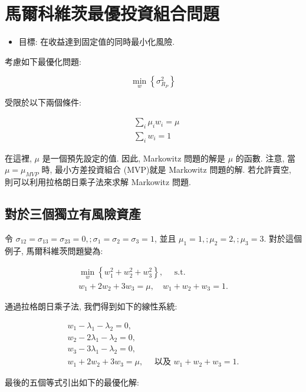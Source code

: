\documentclass[letterpaper]{article}
\begin{document}
		\section{馬爾科維茨最優投資組合問題}
		\begin{itemize}
			\item 目標: 在收益達到固定值的同時最小化風險. 
		\end{itemize}
		
		考慮如下最優化問題: 
		
		$$
		\min _{w}\left\{\sigma_{R_{P}}^{2}\right\}
		$$
		
		受限於以下兩個條件: 
		
		$$
		\begin{aligned}
			& \sum_{i} \mu_{i} w_{i}=\mu \\
			& \sum_{i} w_{i}=1
		\end{aligned}
		$$
		
		在這裡, $\mu$ 是一個預先設定的值. 因此, Markowitz 問題的解是 $\mu$ 的函數. 注意, 當 $\mu = \mu_{MVP}$ 時, 最小方差投資組合 (MVP)就是 Markowitz 問題的解. 若允許賣空, 則可以利用拉格朗日乘子法來求解 Markowitz 問題. 
		
		
		\subsection{對於三個獨立有風險資產}
		令 $\sigma_{12}=\sigma_{13}=\sigma_{23}=0, ;\sigma_{1}=\sigma_{2}=\sigma_{3}=1$, 並且 $\mu_{1}=1, ;\mu_{2}=2, ;\mu_{3}=3$. 對於這個例子, 馬爾科維茨問題變為: 
		
		$$
		\begin{gathered}
			\min _{w}\left\{w_{1}^{2}+w_{2}^{2}+w_{3}^{2}\right\}, \quad \text { s.t. } \\
			w_{1}+2 w_{2}+3 w_{3}=\mu, \quad w_{1}+w_{2}+w_{3}=1 .
		\end{gathered}
		$$
		
		通過拉格朗日乘子法, 我們得到如下的線性系統: 
		
		$$
		\begin{gathered}
			w_{1}-\lambda_{1}-\lambda_{2}=0, \\
			w_{2}-2 \lambda_{1}-\lambda_{2}=0, \\
			w_{3}-3 \lambda_{1}-\lambda_{2}=0, \\
			w_{1}+2 w_{2}+3 w_{3}=\mu, \quad \text { 以及 } w_{1}+w_{2}+w_{3}=1 .
		\end{gathered}
		$$
		
		最後的五個等式引出如下的最優化解: 
		
\end{document}
